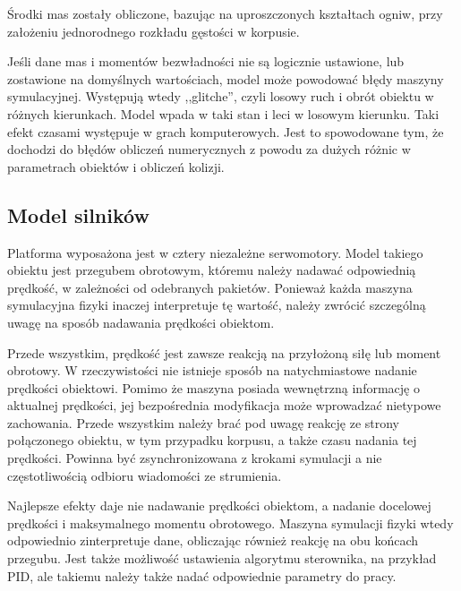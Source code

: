 		Środki mas zostały obliczone, bazując na uproszczonych kształtach ogniw, przy założeniu jednorodnego rozkładu gęstości w korpusie.
		
		Jeśli dane mas i momentów bezwładności nie są logicznie ustawione, lub zostawione na domyślnych wartościach, model może powodować błędy maszyny symulacyjnej.
		Występują wtedy ,,glitche'', czyli losowy ruch i obrót obiektu w różnych kierunkach. Model wpada w taki stan i leci w losowym kierunku. 
		Taki efekt czasami występuje w grach komputerowych. Jest to spowodowane tym, że dochodzi do błędów obliczeń numerycznych z powodu za dużych różnic w parametrach obiektów
		i obliczeń kolizji.
		
	\subsection{Model silników}
		Platforma wyposażona jest w cztery niezależne serwomotory. 
		Model takiego obiektu jest przegubem obrotowym, któremu należy nadawać odpowiednią prędkość, w zależności od odebranych pakietów.
		Ponieważ każda maszyna symulacyjna fizyki inaczej interpretuje tę wartość, należy zwrócić szczególną uwagę na sposób nadawania prędkości obiektom.
		
		Przede wszystkim, prędkość jest zawsze reakcją na przyłożoną siłę lub moment obrotowy. W rzeczywistości nie istnieje sposób na natychmiastowe nadanie prędkości obiektowi.
		Pomimo że maszyna posiada wewnętrzną informację o aktualnej prędkości,
		jej bezpośrednia modyfikacja może wprowadzać nietypowe zachowania. Przede wszystkim należy brać pod uwagę reakcję ze strony połączonego obiektu, w tym przypadku korpusu,
		a także czasu nadania tej prędkości. Powinna być zsynchronizowana z krokami symulacji a nie częstotliwością odbioru wiadomości ze strumienia.
		
		Najlepsze efekty daje nie nadawanie prędkości obiektom, a nadanie docelowej prędkości i maksymalnego momentu obrotowego.
		Maszyna symulacji fizyki wtedy odpowiednio zinterpretuje dane, obliczając również reakcję na obu końcach przegubu.
		Jest także możliwość ustawienia algorytmu sterownika, na przykład PID, ale takiemu należy także nadać odpowiednie parametry do pracy.
		

